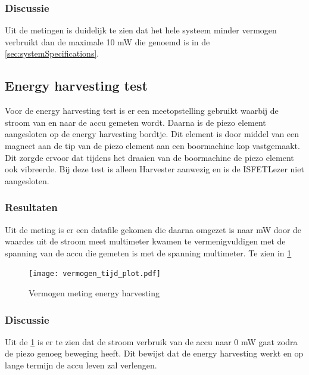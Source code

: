 \subsubsection{Discussie}
Uit de metingen is duidelijk te zien dat het hele systeem minder vermogen verbruikt dan de maximale 10 mW die genoemd is in de \cref{sec:systemSpecifications}. 


\subsection{Energy harvesting test}
Voor de energy harvesting test is er een meetopstelling gebruikt waarbij de stroom van en naar de accu gemeten wordt. Daarna is de piezo element aangesloten op de energy harvesting bordtje. Dit element is door middel van een magneet aan de tip van de piezo element aan een boormachine kop vastgemaakt. Dit zorgde ervoor dat tijdens het draaien van de boormachine de piezo element ook vibreerde. Bij deze test is alleen Harvester aanwezig en is de ISFETLezer niet aangesloten.

\subsubsection{Resultaten}
Uit de meting is er een datafile gekomen die daarna omgezet is naar mW door de waardes uit de stroom meet multimeter kwamen te vermenigvuldigen met de spanning van de accu die gemeten is met de spanning multimeter. Te zien in \cref{fig:vermogenPlot}

\begin{figure}[ht]
    \centering
    \texttt{[image: vermogen\_tijd\_plot.pdf]}
    \caption{Vermogen meting energy harvesting}
    \label{fig:vermogenPlot}
\end{figure}

\subsubsection{Discussie}
Uit de \cref{fig:vermogenPlot} is er te zien dat de stroom verbruik van de accu naar 0 mW gaat zodra de piezo genoeg beweging heeft. Dit bewijst dat de energy harvesting werkt en op lange termijn de accu leven zal verlengen.